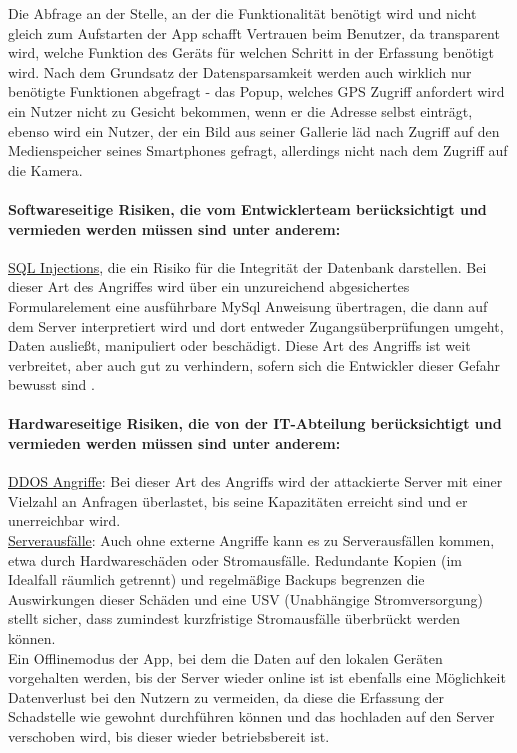Die Abfrage an der Stelle, an der die Funktionalität benötigt wird und nicht gleich zum Aufstarten der App schafft Vertrauen beim Benutzer, da transparent wird, welche Funktion des Geräts für welchen Schritt in der Erfassung benötigt wird. Nach dem Grundsatz der Datensparsamkeit werden auch wirklich nur benötigte Funktionen abgefragt - das Popup, welches GPS Zugriff anfordert wird ein Nutzer nicht zu Gesicht bekommen, wenn er die Adresse selbst einträgt, ebenso wird ein Nutzer, der ein Bild aus seiner Gallerie läd nach Zugriff auf den Medienspeicher seines Smartphones gefragt, allerdings nicht nach dem Zugriff auf die Kamera.\\

\paragraph{Softwareseitige Risiken, die vom Entwicklerteam berücksichtigt und vermieden werden müssen sind unter anderem:}

\underline{SQL Injections}, die ein Risiko für die Integrität der Datenbank darstellen. Bei dieser Art des Angriffes wird über ein unzureichend abgesichertes Formularelement eine ausführbare MySql Anweisung übertragen, die dann auf dem Server interpretiert wird und dort entweder Zugangsüberprüfungen umgeht, Daten ausließt, manipuliert oder beschädigt. Diese Art des Angriffs ist weit verbreitet, aber auch gut zu verhindern, sofern sich die Entwickler dieser Gefahr bewusst sind \cite{sqlInjections}.


\paragraph{Hardwareseitige Risiken, die von der IT-Abteilung berücksichtigt und vermieden werden müssen sind unter anderem:}

\underline{DDOS Angriffe}: Bei dieser Art des Angriffs wird der attackierte Server mit einer Vielzahl an Anfragen überlastet, bis seine Kapazitäten erreicht sind und er unerreichbar wird.\\
\underline{Serverausfälle}: Auch ohne externe Angriffe kann es zu Serverausfällen kommen, etwa durch Hardwareschäden oder Stromausfälle. Redundante Kopien (im Idealfall räumlich getrennt) und regelmäßige Backups begrenzen die Auswirkungen dieser Schäden und eine USV (Unabhängige Stromversorgung) stellt sicher, dass zumindest kurzfristige Stromausfälle überbrückt werden können.\\ Ein Offlinemodus der App, bei dem die Daten auf den lokalen Geräten vorgehalten werden, bis der Server wieder online ist ist ebenfalls eine Möglichkeit Datenverlust bei den Nutzern zu vermeiden, da diese die Erfassung der Schadstelle wie gewohnt durchführen können und das hochladen auf den Server verschoben wird, bis dieser wieder betriebsbereit ist.


